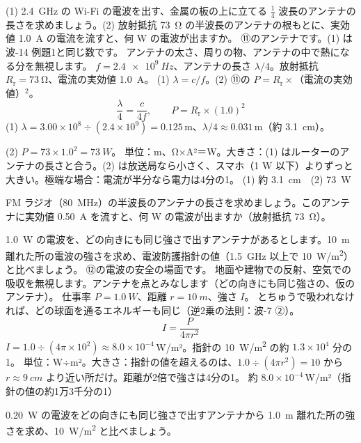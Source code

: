 \begin{phreidai}
\label{ph:電-15:ex13}(1) \qty{2.4}{GHz} の Wi-Fi の電波を出す、金属の板の上に立てる $\tfrac14$ 波長のアンテナの長さを求めましょう。(2) 放射抵抗 \qty{73}{\ohm} の半波長のアンテナの根もとに、実効値 \qty{1.0}{A} の電流を流すと、何 W の電波が出ますか。
\phbamen
⑪のアンテナです。(1) は波-14 例題1と同じ数です。
\phmushi
アンテナの太さ、周りの物、アンテナの中で熱になる分を無視します。
\phzu
$f=\qty{2.4e9}{Hz}$、アンテナの長さ $\lambda/4$。放射抵抗 $R_{\mathrm r}=\qty{73}{\ohm}$、電流の実効値 \qty{1.0}{A}。
\phriyu
(1) $\lambda=c/f$。(2) ⑪の $P=R_{\mathrm r}\times$（電流の実効値）$^2$。
\phtateru
\[ \frac{\lambda}{4}=\frac{c}{4f},\qquad P=R_{\mathrm r}\times(1.0)^2 \]
\phtoku
(1) $\lambda=3.00\times10^8\div(2.4\times10^9)=0.125$\,m、$\lambda/4\approx0.031$\,m（約 \qty{3.1}{cm}）。\par
(2) $P=73\times1.0^2=\qty{73}{W}$。
\phtashikame
単位：m、Ω×A²＝W。大きさ：(1) はルーターのアンテナの長さと合う。(2) は放送局なら小さく、スマホ（1 W 以下）よりずっと大きい。極端な場合：電流が半分なら電力は4分の1。
\kotae (1) 約 \qty{3.1}{cm}　(2) \qty{73}{W}
\end{phreidai}
\begin{jibun}
FM ラジオ（\qty{80}{MHz}）の半波長のアンテナの長さを求めましょう。このアンテナに実効値 \qty{0.50}{A} を流すと、何 W の電波が出ますか（放射抵抗 \qty{73}{\ohm}）。
\end{jibun}

\begin{phreidai}
\label{ph:電-15:ex14}\qty{1.0}{W} の電波を、どの向きにも同じ強さで出すアンテナがあるとします。\qty{10}{m} 離れた所の電波の強さを求め、電波防護指針の値（\qty{1.5}{GHz} 以上で \qty{10}{W/m^2}）と比べましょう。
\phbamen
⑫の電波の安全の場面です。
\phmushi
地面や建物での反射、空気での吸収を無視します。アンテナを点とみなします（どの向きにも同じ強さの、仮のアンテナ）。
\phzu
仕事率 $P=\qty{1.0}{W}$、距離 $r=\qty{10}{m}$、強さ $I$。
\phriyu
とちゅうで吸われなければ、どの球面を通るエネルギーも同じ（逆2乗の法則：波-7 ②）。
\phtateru
\[ I=\frac{P}{4\pi r^2} \]
\phtoku
$I=1.0\div(4\pi\times10^2)\approx8.0\times10^{-4}$\,W/m²。指針の \qty{10}{W/m^2} の約 $1.3\times10^4$ 分の1。
\phtashikame
単位：W÷m²。大きさ：指針の値を超えるのは、$1.0\div(4\pi r^2)=10$ から $r\approx\qty{9}{cm}$ より近い所だけ。距離が2倍で強さは4分の1。
\kotae 約 $8.0\times10^{-4}$\,W/m²（指針の値の約1万3千分の1）
\end{phreidai}
\begin{jibun}
\qty{0.20}{W} の電波をどの向きにも同じ強さで出すアンテナから \qty{1.0}{m} 離れた所の強さを求め、\qty{10}{W/m^2} と比べましょう。
\end{jibun}

